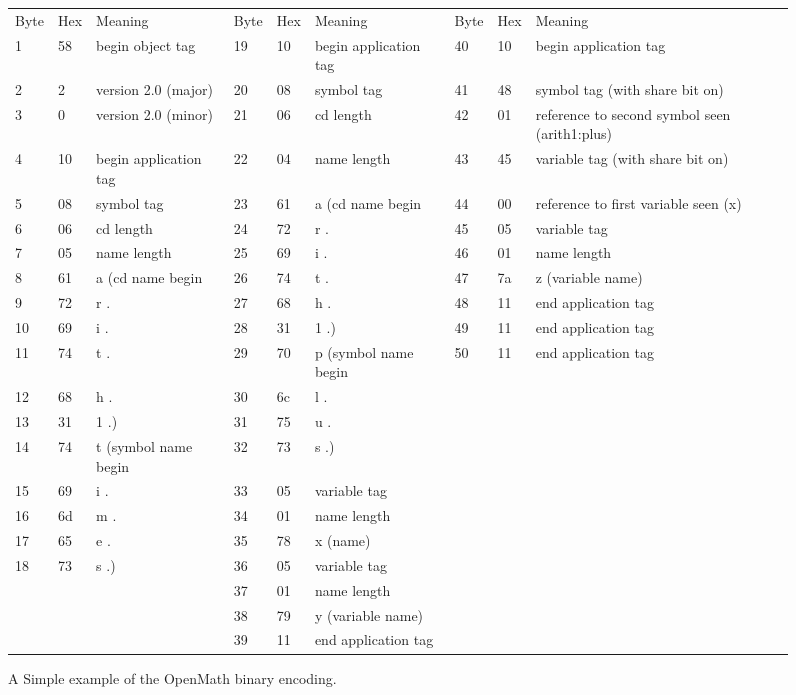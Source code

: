 \documentclass{report}
\def\OM{OpenMath\xspace}
\begin{document}
\begin{figure}\centering\footnotesize
\begin{tabular}{lllllllll}
	    Byte &Hex &Meaning &
	    Byte &Hex &Meaning &
	    Byte &Hex &Meaning\\
	    1 &58 &begin object tag &
	    19 &10 &begin application tag &
	    40 &10 &begin application tag\\
	    2 &2 & version 2.0 (major) &
	    20 &08 &symbol tag &
	    41 &48 &symbol tag (with share bit on) \\
	    3 &0 & version 2.0 (minor) &
	    21 &06 &cd length &
	    42 &01 &reference to second symbol seen (arith1:plus)\\
	    4 &10 &begin application tag &
	    22 &04 &name length &
	    43 &45 &variable tag (with share bit on)  \\
	    5 &08 &symbol tag &
	    23 &61 &a (cd name begin &
	    44 &00 &reference to first variable seen (x) \\
	    6 &06 &cd length  &
	    24 &72 &r  . &
	    45 &05 &variable tag \\
	    7 &05 &name length &
	    25 &69 &i  . &
	    46 &01 &name length\\
	    8 &61 &a (cd name begin &
	    26 &74 &t  . &
	    47 &7a &z (variable name) \\
	    9 &72 &r  . &
	    27 &68 &h  . &
	    48 &11 &end application tag\\
	    10 &69 &i  . &
	    28 &31 &1  .) &
	    49 &11 &end application tag \\
	    11 &74 &t  . &
	    29 &70 &p (symbol name begin &
	    50 &11 &end application tag\\
	    12 &68 &h  . &
	    30 &6c &l  . &
            &&\\               
	    13 &31 &1  .) &
	    31 &75 &u  .  &
             &&\\
	    14 &74 &t (symbol name begin &
	    32 &73 &s  .)  &
            &&\\
	    15 &69 &i  . &
	    33 &05 &variable tag &
            && \\
	    16 &6d &m  . &
	    34 &01 &name length  &
            && \\
	    17 &65 &e  . &
	    35 &78 &x (name)  &
            &&\\
	    18 &73 &s  .) &
	    36 &05 &variable tag  &
            && \\
	    &&&
	    37 &01 &name length  &
	    &&\\
            &&&
	    38 &79 &y (variable name)  &
	    &&\\
            &&&
	    39 &11 &end application tag  &
	    &&\\
\end{tabular}
\caption{A Simple example of the \OM binary encoding.}\label{fig_bin-enc_ex}
\end{figure}
\end{document}
